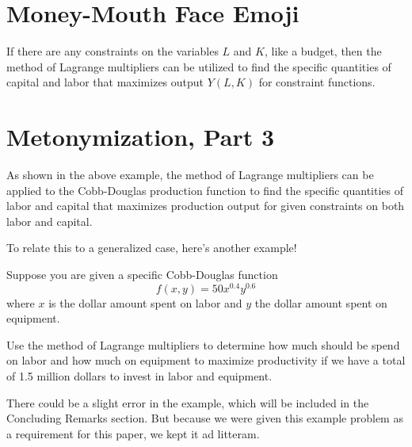 \chapter{Money-Mouth Face Emoji}
If there are any constraints on the variables $L$ and $K$, like a budget, then the method of Lagrange multipliers can be utilized to find the specific quantities of capital and labor that maximizes output $Y(L, K)$ for constraint functions.
\setcounter{chapter}{10}
\chapter{Metonymization, Part 3}
As shown in the above example, the method of Lagrange multipliers can be applied to the Cobb-Douglas production function to find the specific quantities of labor and capital that maximizes production output for given constraints on both labor and capital.

To relate this to a generalized case, here's another example!
\begin{eg}
	Suppose you are given a specific Cobb-Douglas function \[f(x, y) = 50x^{0.4}y^{0.6}\] where $x$ is the dollar amount spent on labor and $y$ the dollar amount spent on equipment.
	
	Use the method of Lagrange multipliers to determine how much should be spend on labor and how much on equipment to maximize productivity if we have a total of 1.5 million dollars to invest in labor and equipment.
	
	There could be a slight error in the example, which will be included in the Concluding Remarks section. But because we were given this example problem as a requirement for this paper, we kept it ad litteram.
\end{eg}